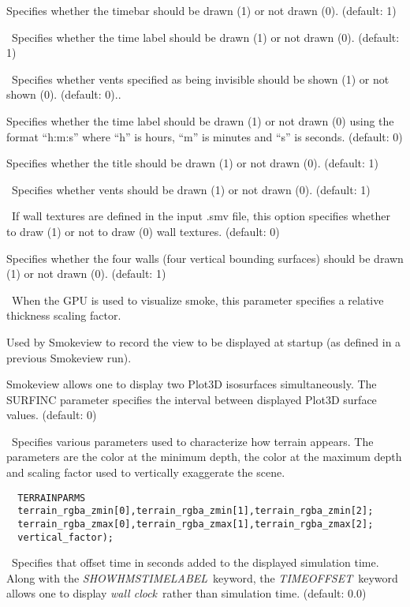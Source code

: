 \documentclass[11pt,twoside]{book}
\newcommand{\hitem}[1]{\item[{\bf #1} \hfill]}
\begin{document}
\hitem{SHOWTIMEBAR}Specifies whether the timebar should be drawn
(1) or not drawn (0). (default: 1)

\hitem{SHOWTIMELABEL}\ Specifies whether the time label should be
drawn (1) or not drawn (0). (default: 1)

\hitem{SHOWTRANSPARENTVENTS}\ Specifies whether vents specified as being invisible should be
shown (1) or not shown (0). (default: 0)..

\hitem{SHOWHMSTIMELABEL}Specifies whether the time label should be
drawn (1) or not drawn (0) using the format ``h:m:s'' where ``h''
is hours, ``m'' is minutes and ``s'' is seconds.  (default: 0)

\hitem{SHOWTITLE}Specifies whether
the title should be drawn (1) or not drawn (0).
(default: 1)

\hitem{SHOWVENTS}\ Specifies whether vents should be drawn
(1) or not drawn (0).  (default: 1)

\hitem{SHOWALLTEXTURES}\ If wall textures are defined in the input .smv file, this
option specifies whether to draw (1) or not to draw (0) wall textures.
(default: 0)


\hitem{SHOWWALLS}Specifies whether
the four walls (four vertical bounding surfaces) should be drawn (1) or not drawn (0).
(default: 1)

\hitem{SMOKERTHICK}\ When the GPU is used to visualize smoke, this parameter specifies a
relative thickness scaling factor.

\hitem{STARTUPVIEW}Used by Smokeview to record the view to be
displayed at startup (as defined in a previous Smokeview run).

\hitem{SURFINC}Smokeview allows one to display two Plot3D
isosurfaces simultaneously.  The SURFINC parameter specifies the
interval between displayed Plot3D surface values. (default: 0)

\hitem{TERRAINPARMS}\ Specifies various parameters used to characterize
how terrain appears.  The parameters are the color at the minimum depth,
the color at the maximum depth and scaling factor used to vertically exaggerate
the scene.
\begin{lstlisting}
  TERRAINPARMS
  terrain_rgba_zmin[0],terrain_rgba_zmin[1],terrain_rgba_zmin[2];
  terrain_rgba_zmax[0],terrain_rgba_zmax[1],terrain_rgba_zmax[2];
  vertical_factor);
\end{lstlisting}

\hitem{TIMEOFFSET}\ Specifies that offset time in seconds added to
the displayed simulation time.  Along with the {\em
SHOWHMSTIMELABEL}\ keyword, the {\em TIMEOFFSET}\ keyword allows
one to display {\em wall clock}\ rather than simulation time.
(default: 0.0)
\end{document}
